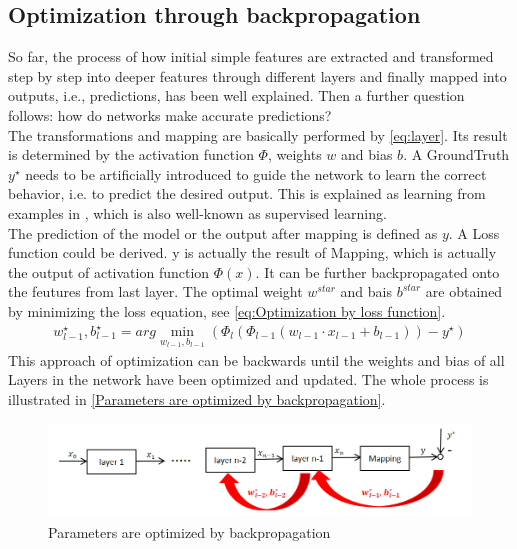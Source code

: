   \subsection{Optimization through backpropagation}
  So far, the process of how initial simple features are extracted and transformed step by step into deeper features through different layers and finally mapped into outputs, 
  i.e., predictions, has been well explained. Then a further question follows: how do networks make accurate predictions?\\
  The transformations and mapping are basically performed by \autoref{eq:layer}. Its result is determined by the activation function $\Phi$, weights $w$ and bias $b$. 
  A GroundTruth $y^{\star }$ needs to be artificially introduced to guide the network to learn the correct behavior, i.e. to predict the desired output. This is explained as
  learning from examples in \cite{russel2010}, which is also well-known as supervised learning. \\
  The prediction of the model or the output after mapping is defined as $y$. A Loss function could be derived. y is actually the result of Mapping, which is actually the output 
  of activation function $\Phi(x)$. It can be further backpropagated onto the feutures from last layer. The optimal weight $w^{star}$ and bais $b^{star}$ are obtained by 
  minimizing the loss equation, see \autoref{eq:Optimization by loss function}. 
  \begin{align}
    w_{l-1}^{\star}, b_{l-1}^{\star}=arg\min_{w_{l-1},b_{l-1}}(\Phi_{l}(\Phi_{l-1}(w_{l-1}\cdot x_{l-1}+b_{l-1}))-y^{\star } ) 
     \label{eq:Optimization by loss function}
  \end{align}
  This approach of optimization can be backwards until the weights and bias of all Layers in the network have been optimized and updated. The whole process is illustrated in 
  \autoref{Parameters are optimized by backpropagation}.
  \begin{figure}
    \centering
    \includegraphics[width=0.9\linewidth]{example_images/bachpropagation}
    \caption{Parameters are optimized by backpropagation}
    \label{Parameters are optimized by backpropagation}
  \end{figure}
